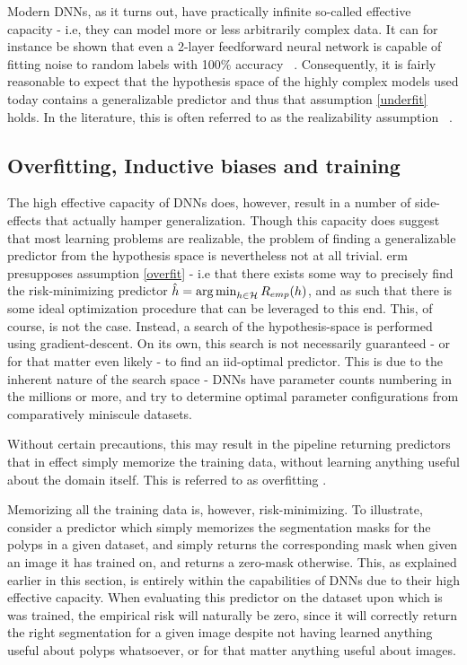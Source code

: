 		Modern DNNs, as it turns out, have practically infinite so-called effective capacity - i.e, they can model more or less arbitrarily complex data. It can for instance be shown that even a 2-layer feedforward neural network is capable of fitting noise to random labels with 100\% accuracy ~\cite{randomlabels}. Consequently, it is fairly reasonable to expect that the hypothesis space of the highly complex models used today contains a generalizable predictor and thus that assumption \ref{underfit} holds. In the literature, this is often referred to as the realizability assumption ~\cite{machine_learning_theory}. 
		
	\subsection{Overfitting, Inductive biases and training}
	The high effective capacity of DNNs does, however, result in a number of side-effects that actually hamper generalization. Though this capacity does suggest that most learning problems are realizable, the problem of finding a generalizable predictor from the hypothesis space is nevertheless not at all trivial. \gls{erm} presupposes assumption \ref{overfit} - i.e that there exists some way to precisely find the risk-minimizing predictor \(\hat{h} = \operatorname*{arg\,min}_{h \in \mathcal{H}}R_{emp}(h)\), and as such that there is some ideal optimization procedure that can be leveraged to this end. This, of course, is not the case. Instead, a search of the hypothesis-space is performed using gradient-descent. On its own, this search is not necessarily guaranteed - or for that matter even likely - to find an \gls{iid}-optimal predictor. This is due to the inherent nature of the search space - DNNs have parameter counts numbering in the millions or more, and try to determine optimal parameter configurations from comparatively miniscule datasets.
		
	Without certain precautions, this may result in the pipeline returning predictors that in effect simply memorize the training data, without learning anything useful about the domain itself. This is referred to as overfitting \cite{deep_learning_book}. 

	Memorizing all the training data is, however, risk-minimizing. To illustrate, consider a predictor which simply memorizes the segmentation masks for the polyps in a given dataset, and simply returns the corresponding mask when given an image it has trained on, and returns a zero-mask otherwise. This, as explained earlier in this section, is entirely within the capabilities of DNNs due to their high effective capacity. When evaluating this predictor on the dataset upon which is was trained, the empirical risk will naturally be zero, since it will correctly return the right segmentation for a given image despite not having learned anything useful about polyps whatsoever, or for that matter anything useful about images.

